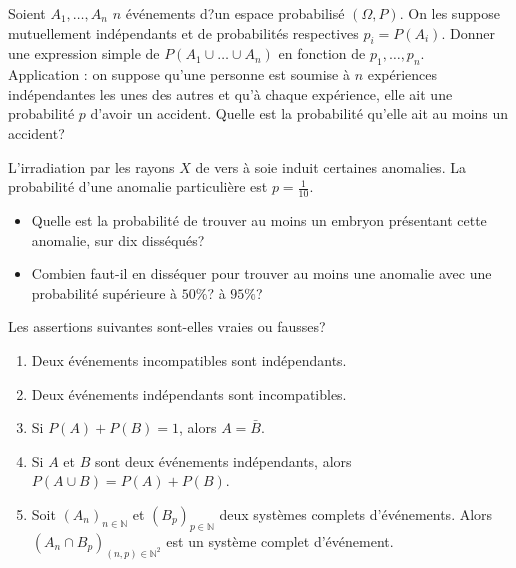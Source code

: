 \documentclass{book}
\begin{document}
\begin{Exercice}
Soient $A_1, \dots,A_n$  $n$ événements d?un espace probabilisé $(\Omega,P)$.  On les suppose mutuellement indépendants et de probabilités respectives $p_i = P(A_i)$. 
 Donner une expression simple de $P(A_1\cup\dots\cup A_n)$ en fonction de $p_1,\dots,p_n$.\\
Application : on suppose qu'une personne est soumise à $n$ expériences indépendantes les unes des autres et qu'à chaque expérience, elle ait une probabilité $p$ d'avoir un accident. Quelle est la probabilité qu'elle ait au moins un accident?
\end{Exercice}
\begin{Exercice}[Irradiation]
L'irradiation par les rayons $X$ de vers à soie induit certaines anomalies.
La probabilité d'une anomalie particulière est $p=\frac1{10}$.
\begin{itemize}
\item
  Quelle est la probabilité de trouver au moins un embryon présentant
  cette anomalie, sur dix disséqués?
\item
  Combien faut-il en disséquer pour trouver au moins une anomalie
  avec une probabilité supérieure à $50\%$? à $95\%$?
\end{itemize}
\end{Exercice}
\begin{Exercice}
Les assertions suivantes sont-elles vraies ou fausses?
\begin{enumerate}
\item Deux événements incompatibles sont indépendants.
\item Deux événements indépendants sont incompatibles.
\item Si $P(A)+P(B)=1$, alors $A=\bar B$.
\item Si $A$ et $B$ sont deux événements indépendants, alors $P(A\cup B)=P(A)+P(B)$.
\item Soit $(A_n)_{n\in\mathbb N}$ et $(B_p)_{p\in\mathbb N}$ deux systèmes complets d'événements. Alors $(A_n\cap B_p)_{(n,p)\in\mathbb N^2}$ est un système complet d'événement.
\end{enumerate}
\end{Exercice}
\end{document}
